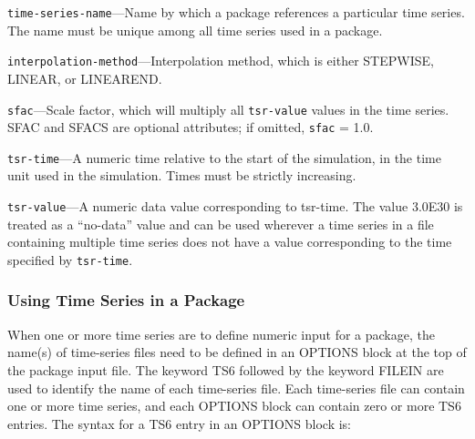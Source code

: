\begin{description}
\item \texttt{time-series-name}---Name by which a package references a particular time series. The name must be unique among all time series used in a package.
\end{description}

\begin{description}
\item \texttt{interpolation-method}---Interpolation method, which is either STEPWISE, LINEAR, or LINEAREND.
\end{description}

\begin{description}
\item \texttt{sfac}---Scale factor, which will multiply all \texttt{tsr-value} values in the time series. SFAC and SFACS are optional attributes; if omitted, \texttt{sfac} = 1.0. 
\end{description}

\begin{description}
\item \texttt{tsr-time}---A numeric time relative to the start of the simulation, in the time unit used in the simulation. Times must be strictly increasing.
\end{description}

\begin{description}
\item \texttt{tsr-value}---A numeric data value corresponding to tsr-time. The value 3.0E30 is treated as a ``no-data'' value and can be used wherever a time series in a file containing multiple time series does not have a value corresponding to the time specified by \texttt{tsr-time}.
\end{description}


\subsubsection{Using Time Series in a Package}

When one or more time series are to define numeric input for a package, the name(s) of time-series files need to be defined in an OPTIONS block at the top of the package input file. The keyword TS6 followed by the keyword FILEIN are used to identify the name of each time-series file. Each time-series file can contain one or more time series, and each OPTIONS block can contain zero or more TS6 entries. The syntax for a TS6 entry in an OPTIONS block is:

